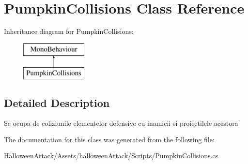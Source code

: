 \hypertarget{class_pumpkin_collisions}{}\section{Pumpkin\+Collisions Class Reference}
\label{class_pumpkin_collisions}
Inheritance diagram for Pumpkin\+Collisions\+:\begin{figure}[H]
\begin{center}
\leavevmode
\includegraphics[height=2.000000cm]{class_pumpkin_collisions}
\end{center}
\end{figure}


\subsection{Detailed Description}
Se ocupa de coliziunile elementelor defensive cu inamicii si proiectilele acestora 

The documentation for this class was generated from the following file\+:\begin{DoxyCompactItemize}
\item 
Halloween\+Attack/\+Assets/halloween\+Attack/\+Scripts/Pumpkin\+Collisions.\+cs\end{DoxyCompactItemize}
